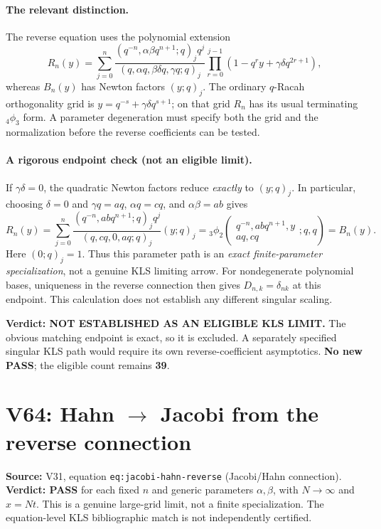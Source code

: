 \documentclass[11pt]{article}
\begin{document}
\paragraph{The relevant distinction.}
The reverse equation uses the polynomial extension
\[
R_n(y)=\sum_{j=0}^n
\frac{(q^{-n},\alpha\beta q^{n+1};q)_j q^j}
{(q,\alpha q,\beta\delta q,\gamma q;q)_j}
\prod_{r=0}^{j-1}(1-q^r y+\gamma\delta q^{2r+1}),
\]
whereas $B_n(y)$ has Newton factors $(y;q)_j$. The ordinary $q$-Racah orthogonality grid is $y=q^{-s}+\gamma\delta q^{s+1}$; on that grid $R_n$ has its usual terminating ${}_4\phi_3$ form. A parameter degeneration must specify both the grid and the normalization before the reverse coefficients can be tested.

\paragraph{A rigorous endpoint check (not an eligible limit).}
If $\gamma\delta=0$, the quadratic Newton factors reduce \emph{exactly} to $(y;q)_j$. In particular, choosing $\delta=0$ and $\gamma q=aq$, $\alpha q=cq$, and $\alpha\beta=ab$ gives
\[
R_n(y)=\sum_{j=0}^n
\frac{(q^{-n},abq^{n+1};q)_j q^j}
{(q,cq,0,aq;q)_j}(y;q)_j
={}_3\phi_2\!\left(\begin{matrix}q^{-n},abq^{n+1},y\\aq,cq\end{matrix};q,q\right)=B_n(y).
\]
Here $(0;q)_j=1$. Thus this parameter path is an \emph{exact finite-parameter specialization}, not a genuine KLS limiting arrow. For nondegenerate polynomial bases, uniqueness in the reverse connection then gives $D_{n,k}=\delta_{nk}$ at this endpoint. This calculation does not establish any different singular scaling.

\noindent\textbf{Verdict: NOT ESTABLISHED AS AN ELIGIBLE KLS LIMIT.} The obvious matching endpoint is exact, so it is excluded. A separately specified singular KLS path would require its own reverse-coefficient asymptotics. \textbf{No new PASS}; the eligible count remains \textbf{39}.


\section{V64: Hahn $\longrightarrow$ Jacobi from the reverse connection}
\noindent\textbf{Source:} V31, equation \texttt{eq:jacobi-hahn-reverse} (Jacobi/Hahn connection). \textbf{Verdict: PASS} for each fixed $n$ and generic parameters $\alpha,\beta$, with $N\to\infty$ and $x=Nt$. This is a genuine large-grid limit, not a finite specialization. The equation-level KLS bibliographic match is not independently certified.
\end{document}
